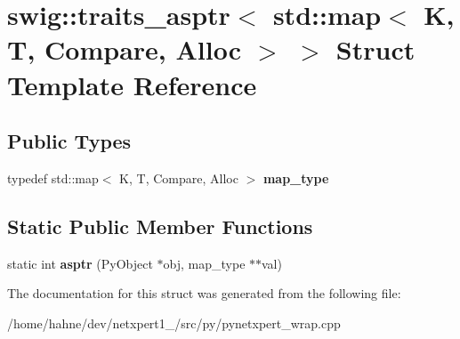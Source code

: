 \hypertarget{structswig_1_1traits__asptr_3_01std_1_1map_3_01K_00_01T_00_01Compare_00_01Alloc_01_4_01_4}{}\section{swig\+:\+:traits\+\_\+asptr$<$ std\+:\+:map$<$ K, T, Compare, Alloc $>$ $>$ Struct Template Reference}
\label{structswig_1_1traits__asptr_3_01std_1_1map_3_01K_00_01T_00_01Compare_00_01Alloc_01_4_01_4}
\subsection*{Public Types}
\begin{DoxyCompactItemize}
\item 
typedef std\+::map$<$ K, T, Compare, Alloc $>$ {\bfseries map\+\_\+type}\hypertarget{structswig_1_1traits__asptr_3_01std_1_1map_3_01K_00_01T_00_01Compare_00_01Alloc_01_4_01_4_a601c281ad9967eee64015c692cc41423}{}\label{structswig_1_1traits__asptr_3_01std_1_1map_3_01K_00_01T_00_01Compare_00_01Alloc_01_4_01_4_a601c281ad9967eee64015c692cc41423}

\end{DoxyCompactItemize}
\subsection*{Static Public Member Functions}
\begin{DoxyCompactItemize}
\item 
static int {\bfseries asptr} (Py\+Object $\ast$obj, map\+\_\+type $\ast$$\ast$val)\hypertarget{structswig_1_1traits__asptr_3_01std_1_1map_3_01K_00_01T_00_01Compare_00_01Alloc_01_4_01_4_aee64fde1f08f8570c566c93075ef4f61}{}\label{structswig_1_1traits__asptr_3_01std_1_1map_3_01K_00_01T_00_01Compare_00_01Alloc_01_4_01_4_aee64fde1f08f8570c566c93075ef4f61}

\end{DoxyCompactItemize}


The documentation for this struct was generated from the following file\+:\begin{DoxyCompactItemize}
\item 
/home/hahne/dev/netxpert1\+\_/src/py/pynetxpert\+\_\+wrap.\+cpp\end{DoxyCompactItemize}
